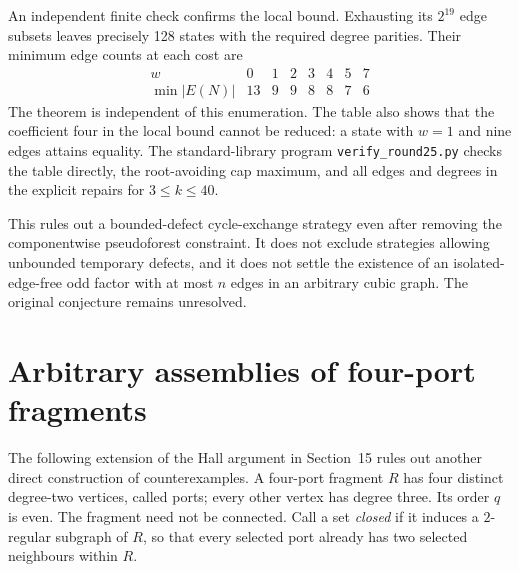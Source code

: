 \documentclass[11pt]{article}
\begin{document}
An independent finite check confirms the local bound. Exhausting its $2^{19}$
edge subsets leaves precisely 128 states with the required degree
parities. Their minimum edge counts at each cost are
\[
\begin{array}{c|rrrrrrr}
 w&0&1&2&3&4&5&7\\\hline
 \min |E(N)|&13&9&9&8&8&7&6
\end{array}
\]
The theorem is independent of this enumeration. The table also shows
that the coefficient four in the local bound cannot be reduced: a
state with $w=1$ and nine edges attains equality.
The standard-library program \texttt{verify\_round25.py} checks the
table directly, the root-avoiding cap maximum, and all edges and
degrees in the explicit repairs for $3\leq k\leq40$.

This rules out a bounded-defect cycle-exchange strategy even after
removing the componentwise pseudoforest constraint. It does not
exclude strategies allowing unbounded temporary defects, and it
does not settle the existence of an isolated-edge-free odd factor
with at most $n$ edges in an arbitrary cubic graph. The original
conjecture remains unresolved.

\section{Arbitrary assemblies of four-port fragments}
The following extension of the Hall argument in Section~15 rules out
another direct construction of counterexamples. A four-port fragment
$R$ has four distinct degree-two vertices, called ports; every other
vertex has degree three. Its order $q$ is even. The fragment need not
be connected. Call a set \emph{closed} if it induces a $2$-regular
subgraph of $R$, so that every selected port already has two selected
neighbours within $R$.
\end{document}
